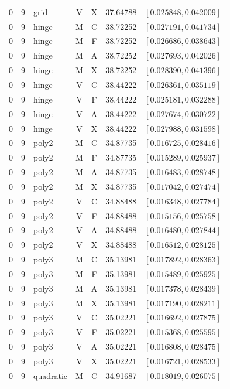 \begin{longtable}{r r l c c r l}
0 & 9 & grid & V & X & 37.64788 & $[0.025848,0.042009]$ \\
0 & 9 & hinge & M & C & 38.72252 & $[0.027191,0.041734]$ \\
0 & 9 & hinge & M & F & 38.72252 & $[0.026686,0.038643]$ \\
0 & 9 & hinge & M & A & 38.72252 & $[0.027693,0.042026]$ \\
0 & 9 & hinge & M & X & 38.72252 & $[0.028390,0.041396]$ \\
0 & 9 & hinge & V & C & 38.44222 & $[0.026361,0.035119]$ \\
0 & 9 & hinge & V & F & 38.44222 & $[0.025181,0.032288]$ \\
0 & 9 & hinge & V & A & 38.44222 & $[0.027674,0.030722]$ \\
0 & 9 & hinge & V & X & 38.44222 & $[0.027988,0.031598]$ \\
0 & 9 & poly2 & M & C & 34.87735 & $[0.016725,0.028416]$ \\
0 & 9 & poly2 & M & F & 34.87735 & $[0.015289,0.025937]$ \\
0 & 9 & poly2 & M & A & 34.87735 & $[0.016483,0.028748]$ \\
0 & 9 & poly2 & M & X & 34.87735 & $[0.017042,0.027474]$ \\
0 & 9 & poly2 & V & C & 34.88488 & $[0.016348,0.027784]$ \\
0 & 9 & poly2 & V & F & 34.88488 & $[0.015156,0.025758]$ \\
0 & 9 & poly2 & V & A & 34.88488 & $[0.016480,0.027844]$ \\
0 & 9 & poly2 & V & X & 34.88488 & $[0.016512,0.028125]$ \\
0 & 9 & poly3 & M & C & 35.13981 & $[0.017892,0.028363]$ \\
0 & 9 & poly3 & M & F & 35.13981 & $[0.015489,0.025925]$ \\
0 & 9 & poly3 & M & A & 35.13981 & $[0.017378,0.028439]$ \\
0 & 9 & poly3 & M & X & 35.13981 & $[0.017190,0.028211]$ \\
0 & 9 & poly3 & V & C & 35.02221 & $[0.016692,0.027875]$ \\
0 & 9 & poly3 & V & F & 35.02221 & $[0.015368,0.025595]$ \\
0 & 9 & poly3 & V & A & 35.02221 & $[0.016808,0.028475]$ \\
0 & 9 & poly3 & V & X & 35.02221 & $[0.016721,0.028533]$ \\
0 & 9 & quadratic & M & C & 34.91687 & $[0.018019,0.026075]$ \\

\end{longtable}

